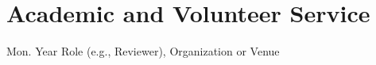 \section{Academic and Volunteer Service}

    \begin{twocolentry}{Mon. Year}
        Role (e.g., Reviewer), Organization or Venue
    \end{twocolentry}
    \vspace{0.10cm}
